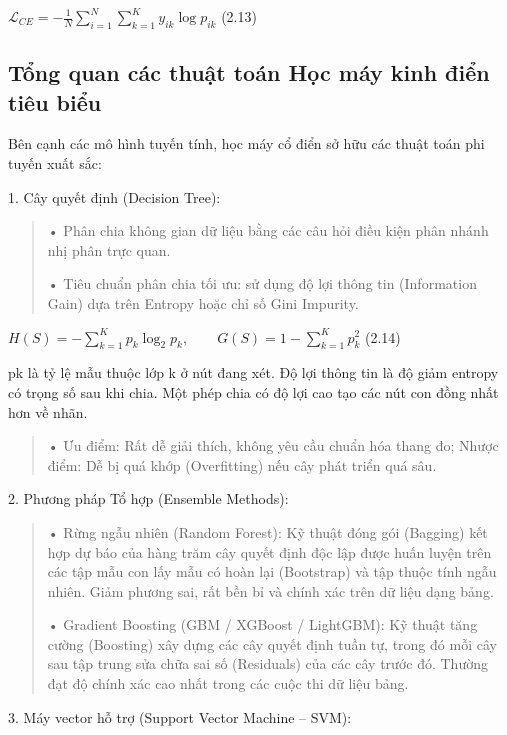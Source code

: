 \(\mathcal{L}_{CE} = - \frac{1}{N}\sum_{i = 1}^{N}{\sum_{k = 1}^{K}y_{ik}}\log p_{ik}\)
(2.13)

\subsection{Tổng quan các thuật toán Học máy kinh điển tiêu biểu}\label{tux1ed5ng-quan-cuxe1c-thuux1eadt-touxe1n-hux1ecdc-muxe1y-kinh-ux111iux1ec3n-tiuxeau-biux1ec3u}

Bên cạnh các mô hình tuyến tính, học máy cổ điển sở hữu các thuật toán
phi tuyến xuất sắc:

1. Cây quyết định (Decision Tree):

\begin{quote}
• Phân chia không gian dữ liệu bằng các câu hỏi điều kiện phân nhánh nhị
phân trực quan.

• Tiêu chuẩn phân chia tối ưu: sử dụng độ lợi thông tin (Information
Gain) dựa trên Entropy hoặc chỉ số Gini Impurity.
\end{quote}

\(H(S) = - \sum_{k = 1}^{K}p_{k}\log_{2}p_{k},\quad\quad G(S) = 1 - \sum_{k = 1}^{K}p_{k}^{2}\)
(2.14)

pk là tỷ lệ mẫu thuộc lớp k ở nút đang xét. Độ lợi thông tin là độ giảm
entropy có trọng số sau khi chia. Một phép chia có độ lợi cao tạo các
nút con đồng nhất hơn về nhãn.

\begin{quote}
• Ưu điểm: Rất dễ giải thích, không yêu cầu chuẩn hóa thang đo; Nhược
điểm: Dễ bị quá khớp (Overfitting) nếu cây phát triển quá sâu.
\end{quote}

2. Phương pháp Tổ hợp (Ensemble Methods):

\begin{quote}
• Rừng ngẫu nhiên (Random Forest): Kỹ thuật đóng gói (Bagging) kết hợp
dự báo của hàng trăm cây quyết định độc lập được huấn luyện trên các tập
mẫu con lấy mẫu có hoàn lại (Bootstrap) và tập thuộc tính ngẫu nhiên.
Giảm phương sai, rất bền bỉ và chính xác trên dữ liệu dạng bảng.

• Gradient Boosting (GBM / XGBoost / LightGBM): Kỹ thuật tăng cường
(Boosting) xây dựng các cây quyết định tuần tự, trong đó mỗi cây sau tập
trung sửa chữa sai số (Residuals) của các cây trước đó. Thường đạt độ
chính xác cao nhất trong các cuộc thi dữ liệu bảng.
\end{quote}

3. Máy vector hỗ trợ (Support Vector Machine -- SVM):

